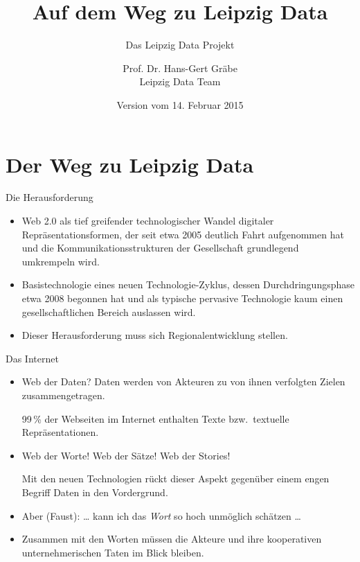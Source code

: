 \documentclass{beamer}
\title{Auf dem Weg zu Leipzig Data}
\subtitle{Das Leipzig Data Projekt}
\author[Leipzig Data Team]{Prof. Dr. Hans-Gert Gräbe\\ Leipzig Data Team}
\institute[]{Universität Leipzig\\ \url{http://leipzig-data.de}}
\date{Version vom 14. Februar 2015}
\begin{document}
\begin{frame}
\titlepage
\end{frame}

\section{Der Weg zu Leipzig Data}
\begin{frame}{Die Herausforderung}{}\small
  \begin{itemize}
  \item Web 2.0 als tief greifender technologischer Wandel digitaler
    Repräsentationsformen, der seit etwa 2005 deutlich Fahrt aufgenommen hat
    und die Kommunikationsstrukturen der Gesellschaft grundlegend umkrempeln
    wird.
  \item Basistechnologie eines neuen Technologie-Zyklus, dessen
    Durchdringungsphase etwa 2008 begonnen hat und als typische pervasive
    Technologie kaum einen gesellschaftlichen Bereich auslassen wird.
  \item Dieser Herausforderung muss sich Regionalentwicklung stellen.
  \end{itemize}
\end{frame}

\begin{frame}{Das Internet}{}
  \begin{itemize}
  \item Web der Daten? Daten werden von {Akteuren} zu von ihnen verfolgten
    {Zielen} zusammengetragen. 

    99\,\% der Webseiten im Internet enthalten {Texte} bzw.\ {textuelle
      Repräsentationen}.
  \item Web der Worte! Web der Sätze! Web der Stories! 

    Mit den neuen Technologien rückt {dieser} Aspekt gegenüber einem engen
    Begriff {Daten} in den Vordergrund.
  \item Aber (Faust): {\ldots} kann ich das \emph{Wort} so hoch unmöglich
    schätzen {\ldots}
  \item Zusammen mit den {Worten} müssen die {Akteure} und ihre
    {kooperativen unternehmerischen Taten} im Blick bleiben.
  \end{itemize}
\end{frame}
\end{document}
